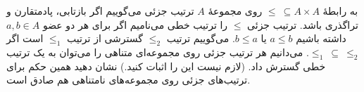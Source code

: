 به رابطهٔ
$\leq\ \subseteq A\times A$
روی مجموعهٔ
$A$
ترتیب جزئی می‌گوییم اگر بازتابی، پادمتقارن و تراگذری باشد. ترتیب جزئی
$\leq$
را ترتیب خطی می‌نامیم اگر برای هر دو عضو
$a,b\in A$
داشته باشیم
$a\leq b$
یا
$b\leq a$.
می‌گوییم ترتیب
$\leq_2$
گسترشی از ترتیب
$\leq_1$
است اگر
$\leq_1\ \subseteq\ \leq_2$.
می‌دانیم هر ترتیب جزئی روی مجموعه‌ای متناهی را می‌توان به یک ترتیب خطی گسترش داد. (لازم نیست این را اثبات کنید.)
نشان دهید همین حکم برای ترتیب‌های جزئی روی مجموعه‌های نامتناهی هم صادق است.